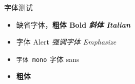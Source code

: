 
\begin{frame}{字体测试}
    \begin{itemize} %
        \item 缺省字体，\bf{粗体 Bold} \it{斜体 Italian}
        \item \alert{字体 Alert} \emph{强调字体 Emphasize}
        \item \texttt{字体 mono} \textsf{字体 sans}
        \item {\bf 粗体} {\bf {}} 
    \end{itemize}
\end{frame}

